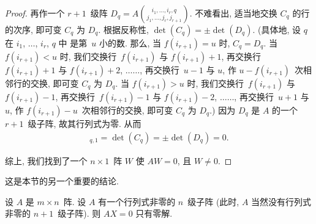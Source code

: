 \begin{proof}
    再作一个 \(r+1\)~级阵
    \(
    \displaystyle
    D_q =
    A\binom{i_1,\dots,i_r,q}
    {j_1,\dots,j_r,j_{r+1}}
    \).
    不难看出, 适当地交换 \(C_q\) 的行的次序,
    即可变 \(C_q\) 为 \(D_q\).
    根据反称性,
    \(\det {(C_q)} = \pm \det {(D_q)}\).
    (具体地, 设 \(q\) 在
    \(i_1\), \(\dots\), \(i_r\), \(q\) 中%
    是第~\(u\) 小的数.
    那么, 当 \(f(i_{r+1}) = u\) 时, \(C_q = D_q\).
    当 \(f(i_{r+1}) < u\) 时,
    我们交换行~\(f(i_{r+1})\) 与 \(f(i_{r+1})+1\),
    再交换行~\(f(i_{r+1})+1\) 与 \(f(i_{r+1})+2\),
    \(\dots \dots\),
    再交换行~\(u-1\) 与 \(u\),
    作 \(u - f(i_{r+1})\)~次相邻行的交换,
    即可变 \(C_q\) 为 \(D_q\).
    当 \(f(i_{r+1}) > u\) 时,
    我们交换行~\(f(i_{r+1})\) 与 \(f(i_{r+1})-1\),
    再交换行~\(f(i_{r+1})-1\) 与 \(f(i_{r+1})-2\),
    \(\dots \dots\),
    再交换行~\(u+1\) 与 \(u\),
    作 \(f(i_{r+1}) - u\)~次相邻行的交换,
    即可变 \(C_q\) 为 \(D_q\).)
    因为 \(D_q\) 是 \(A\) 的一个 \(r+1\)~级子阵,
    故其行列式为零.
    从而
    \begin{align*}
        [AW]_{q,1}
        = \det {(C_q)}
        = \pm \det {(D_q)}
        = 0.
    \end{align*}

    综上, 我们找到了一个 \(n \times 1\)~阵 \(W\)
    使 \(AW = 0\), 且 \(W \neq 0\).
\end{proof}

这是本节的另一个重要的结论.

\begin{theorem}
    设 \(A\) 是 \(m \times n\)~阵.
    设 \(A\) 有一个行列式非零的 \(n\)~级子阵
    (此时, \(A\) 当然没有行列式非零的 \(n+1\)~级子阵).
    则 \(AX = 0\) 只有零解.
\end{theorem}

